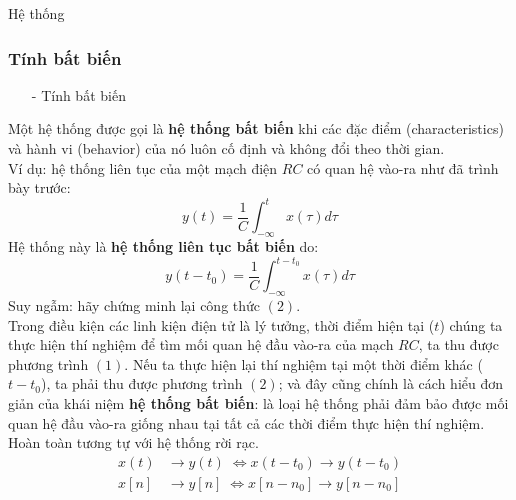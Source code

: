 \documentclass[8pt]{beamer}
\begin{document}
\begin{frame}{Hệ thống}
\subsubsection{Tính bất biến}
\begin{itemize}
\item[-] Tính bất biến
\end{itemize}
Một hệ thống được gọi là \textbf{hệ thống bất biến} khi các đặc điểm (characteristics) và hành vi (behavior) của nó luôn \alert{cố định và không đổi theo thời gian}.
\\ Ví dụ: hệ thống liên tục của một mạch điện $RC$ có quan hệ vào-ra như đã trình bày trước:
\begin{equation}
y(t)=\frac{1}{C}\int_{-\infty}^{t}x(\tau)d\tau
\end{equation}
Hệ thống này là \textbf{hệ thống liên tục bất biến} do:
\begin{equation}
y(t-t_{0})=\frac{1}{C}\int_{-\infty}^{t-t_{0}}x(\tau)d\tau
\end{equation}
Suy ngẫm: hãy chứng minh lại công thức $(2)$. \\
Trong điều kiện các linh kiện điện tử là lý tưởng, thời điểm hiện tại ($t$) chúng ta thực hiện thí nghiệm để tìm mối quan hệ đầu vào-ra của mạch $RC$, ta thu được phương trình $(1)$. Nếu ta thực hiện lại thí nghiệm tại một thời điểm khác ($t-t_{0}$), ta phải thu được phương trình $(2)$; và đây cũng chính là cách hiểu đơn giản của khái niệm \textbf{hệ thống bất biến}: là loại hệ thống phải đảm bảo được mối quan hệ đầu vào-ra \alert{giống nhau tại tất cả các thời điểm thực hiện thí nghiệm}. Hoàn toàn tương tự với hệ thống rời rạc.
\begin{equation*}
	\begin{split}
		x(t)&\to y(t)\; \Leftrightarrow x(t-t_{0})\to y(t-t_{0}) \\
		x[n]&\to y[n]\; \Leftrightarrow x[n-n_{0}]\to y[n-n_{0}] \\
	\end{split}
\end{equation*}
\end{frame}
\end{document}
